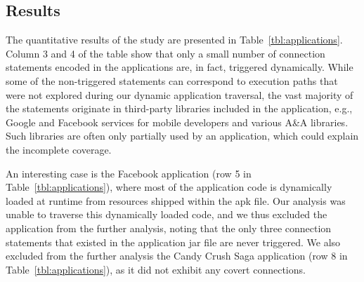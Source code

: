 \vspace{-0.3in}
\subsection{Results}
The quantitative results of the study are presented in %
Table~\ref{tbl:applications}. 
Column 3 and 4 of the table show that only a small number of connection statements encoded in the applications are, in fact, triggered dynamically. 
While some of the non-triggered statements can correspond to execution paths that were not explored during our dynamic application traversal, the vast majority of the statements originate in  
third-party libraries included in the application, e.g., Google and Facebook services for mobile developers and various A\&A libraries. 
Such libraries are often only partially used by an application, which could explain the incomplete coverage.  

An interesting case is the Facebook application (row 5 in Table~\ref{tbl:applications}), where most of the application code is dynamically loaded at runtime from resources shipped within the apk file. 
Our analysis was unable to traverse this dynamically loaded code, and we thus excluded the application from the further analysis, noting that the only three connection statements that existed in the application jar file are never triggered. We also excluded from the further analysis the Candy Crush Saga application (row 8 in Table~\ref{tbl:applications}), as it did not exhibit any covert connections.



